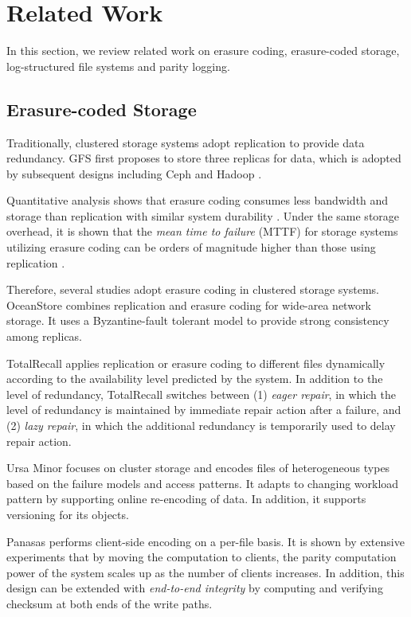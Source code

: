 \section{Related Work}
\label{chap:relatedwork}

In this section, we review related work on erasure coding, erasure-coded
storage, log-structured file systems and parity logging.

\subsection{Erasure-coded Storage}

Traditionally, clustered storage systems adopt replication to provide data
redundancy. GFS \cite{ghemawat03} first proposes to store three replicas for
data, which is adopted by subsequent designs including Ceph \cite{weil06} and
Hadoop \cite{shvachko10}.

Quantitative analysis shows that erasure coding consumes less bandwidth and
storage than replication with similar system durability
\cite{weatherspoon02,rodrigues05}. Under the same storage overhead, it is shown
that the \textit{mean time to failure} (MTTF) for storage systems utilizing
erasure coding can be orders of magnitude higher than those using replication
\cite{weatherspoon02}.

Therefore, several studies adopt erasure coding in clustered storage systems.
OceanStore \cite{kubiatowicz00,rhea03} combines replication and erasure coding
for wide-area network storage.  It uses a Byzantine-fault tolerant model to
provide strong consistency among replicas.

TotalRecall \cite{bhagwan04} applies replication or erasure coding to different
files dynamically according to the availability level predicted by the system.
In addition to the level of redundancy, TotalRecall switches between (1)
\textit{eager repair}, in which the level of redundancy is maintained by
immediate repair action after a failure, and (2) \textit{lazy repair}, in which the
additional redundancy is temporarily used to delay repair action.

Ursa Minor \cite{abd05} focuses on cluster storage and encodes files of
heterogeneous types based on the failure models and access patterns. It adapts
to changing workload pattern by supporting online re-encoding of data. In
addition, it supports versioning for its objects.

Panasas \cite{welch08} performs client-side encoding on a per-file basis. It is
shown by extensive experiments that by moving the computation to clients, the
parity computation power of the system scales up as the number of clients
increases. In addition, this design can be extended with \textit{end-to-end
    integrity} by computing and verifying checksum at both ends of the write
paths.

